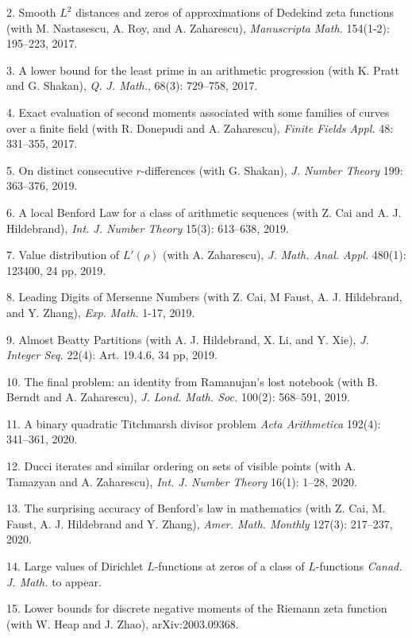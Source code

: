 \documentclass[margin,line,pifont,palatino,courier]{res}
\begin{document}
\begin{resume}
2. {Smooth {$L^2$} distances and zeros of approximations of {D}edekind
	zeta functions} (with M. Nastasescu, A. Roy, and A. Zaharescu), {\it Manuscripta Math.} 154(1-2): 195--223, 2017.
	
3. {A lower bound for the least prime in an arithmetic progression} (with K. Pratt and G. Shakan), {\it Q. J. Math.}, 68(3): 729--758,
2017.

4. {Exact evaluation of second moments associated with some families of
	curves over a finite field} (with R. Donepudi and A. Zaharescu), {\it Finite Fields Appl.} 48: 331--355, 2017.
	
5. {On distinct consecutive $r$-differences} (with G. Shakan), {\it J. Number Theory} 199: 363--376, 2019.

6. {A local Benford Law for a class of arithmetic sequences} (with Z. Cai and A. J. Hildebrand), {\it Int. J. Number Theory} 15(3): 613--638, 2019.
  
7. {Value distribution of $L'(\rho)$} (with A. Zaharescu), {{\it J. Math. Anal. Appl.} 480(1): 123400, 24 pp, 2019.}

8. {Leading Digits of Mersenne Numbers} (with Z. Cai, M Faust, A. J. Hildebrand, and Y. Zhang), {\it Exp. Math.} 1-17, 2019.  %

9. {Almost Beatty Partitions} (with A. J. Hildebrand, X. Li, and Y. Xie), {{\it J. Integer Seq.} 22(4): Art. 19.4.6, 34 pp, 2019.}
 
 10. {The final problem: an identity from Ramanujan's lost notebook} (with B. Berndt and A. Zaharescu), {\it J. Lond. Math. Soc.} 100(2): 568--591, 2019.

11. {A binary quadratic Titchmarsh divisor problem}
{\it Acta Arithmetica} 192(4): 341--361, 2020. %

12. {Ducci iterates and similar ordering on sets of visible points} (with A. Tamazyan and A. Zaharescu), {{\it Int. J. Number Theory} 16(1): 1--28, 2020.}
 
 13. {The surprising accuracy of Benford's law in mathematics} (with Z. Cai, M. Faust, A. J. Hildebrand and Y. Zhang), {\it Amer. Math. Monthly}  127(3): 217--237, 2020. 
 
14. {Large values of Dirichlet $L$-functions at zeros of a class of $L$-functions} {\it Canad. J. Math.} to appear.

15. {Lower bounds for discrete negative moments of the Riemann zeta function (with W. Heap and J. Zhao)}, arXiv:2003.09368.


\end{resume}
\end{document}

